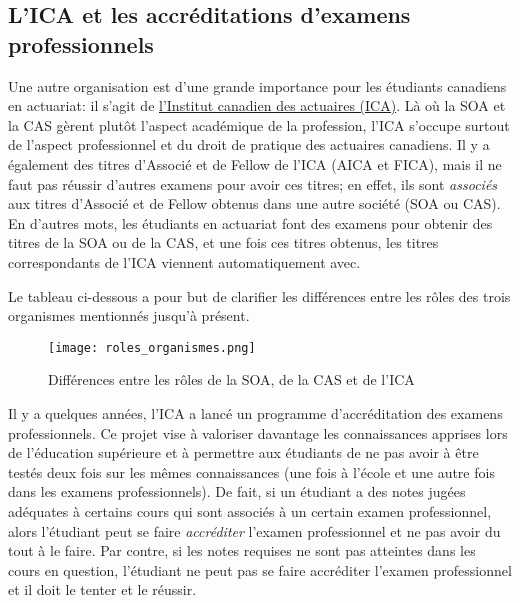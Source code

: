\newpage

\subsection*{L'ICA et les accréditations d'examens professionnels}
\label{subsec:ica}

Une autre organisation est d'une grande importance pour les étudiants canadiens en actuariat: il s'agit de \href{https://www.cia-ica.ca/fr/accueil}{l'Institut canadien des actuaires (ICA)}. Là où la SOA et la CAS gèrent plutôt l'aspect académique de la profession, l'ICA s'occupe surtout de l'aspect professionnel et du droit de pratique des actuaires canadiens. Il y a également des titres d'Associé et de Fellow de l'ICA (AICA et FICA), mais il ne faut pas réussir d'autres examens pour avoir ces titres; en effet, ils sont \textit{associés} aux titres d'Associé et de Fellow obtenus dans une autre société (SOA ou CAS). En d'autres mots, les étudiants en actuariat font des examens pour obtenir des titres de la SOA ou de la CAS, et une fois ces titres obtenus, les titres correspondants de l'ICA viennent automatiquement avec. \vspace{\baselineskip} 

Le tableau ci-dessous a pour but de clarifier les différences entre les rôles des trois organismes mentionnés jusqu'à présent.

\begin{center}
\begin{figure}[hp]
\texttt{[image: roles\_organismes.png]}
\caption{Différences entre les rôles de la SOA, de la CAS et de l'ICA}
\end{figure}
\par
\end{center}

Il y a quelques années, l'ICA a lancé un programme d'accréditation des examens professionnels. Ce projet vise à valoriser davantage les connaissances apprises lors de l'éducation supérieure et à permettre aux étudiants de ne pas avoir à être testés deux fois sur les mêmes connaissances (une fois à l'école et une autre fois dans les examens professionnels). De fait, si un étudiant a des notes jugées adéquates à certains cours qui sont associés à un certain examen professionnel, alors l'étudiant peut se faire \textit{accréditer} l'examen professionnel et ne pas avoir du tout à le faire. Par contre, si les notes requises ne sont pas atteintes dans les cours en question, l'étudiant ne peut pas se faire accréditer l'examen professionnel et il doit le tenter et le réussir. \vspace{\baselineskip}

